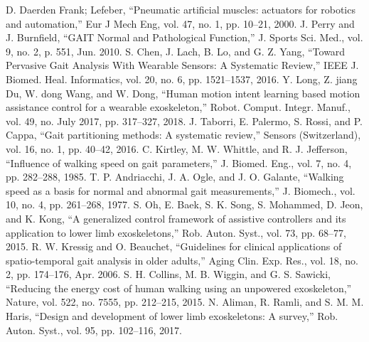 \documentclass[paper,JRM,paper]{jaciiiarticle}
\begin{document}
\begin{thebibliography}{99}
	D. Daerden Frank; Lefeber, “Pneumatic artificial muscles: actuators for robotics and automation,” Eur J Mech Eng, vol. 47, no. 1, pp. 10–21, 2000.
	J. Perry and J. Burnfield, “GAIT Normal and Pathological Function,” J. Sports Sci. Med., vol. 9, no. 2, p. 551, Jun. 2010.
	S. Chen, J. Lach, B. Lo, and G. Z. Yang, “Toward Pervasive Gait Analysis With Wearable Sensors: A Systematic Review,” IEEE J. Biomed. Heal. Informatics, vol. 20, no. 6, pp. 1521–1537, 2016.
	Y. Long, Z. jiang Du, W. dong Wang, and W. Dong, “Human motion intent learning based motion assistance control for a wearable exoskeleton,” Robot. Comput. Integr. Manuf., vol. 49, no. July 2017, pp. 317–327, 2018.
	J. Taborri, E. Palermo, S. Rossi, and P. Cappa, “Gait partitioning methods: A systematic review,” Sensors (Switzerland), vol. 16, no. 1, pp. 40–42, 2016.
	C. Kirtley, M. W. Whittle, and R. J. Jefferson, “Influence of walking speed on gait parameters,” J. Biomed. Eng., vol. 7, no. 4, pp. 282–288, 1985.
	T. P. Andriacchi, J. A. Ogle, and J. O. Galante, “Walking speed as a basis for normal and abnormal gait measurements,” J. Biomech., vol. 10, no. 4, pp. 261–268, 1977.
	S. Oh, E. Baek, S. K. Song, S. Mohammed, D. Jeon, and K. Kong, “A generalized control framework of assistive controllers and its application to lower limb exoskeletons,” Rob. Auton. Syst., vol. 73, pp. 68–77, 2015.
	R. W. Kressig and O. Beauchet, “Guidelines for clinical applications of spatio-temporal gait analysis in older adults,” Aging Clin. Exp. Res., vol. 18, no. 2, pp. 174–176, Apr. 2006.
	S. H. Collins, M. B. Wiggin, and G. S. Sawicki, “Reducing the energy cost of human walking using an unpowered exoskeleton,” Nature, vol. 522, no. 7555, pp. 212–215, 2015.
	N. Aliman, R. Ramli, and S. M. M. Haris, “Design and development of lower limb exoskeletons: A survey,” Rob. Auton. Syst., vol. 95, pp. 102–116, 2017.


\end{thebibliography}
\end{document}
